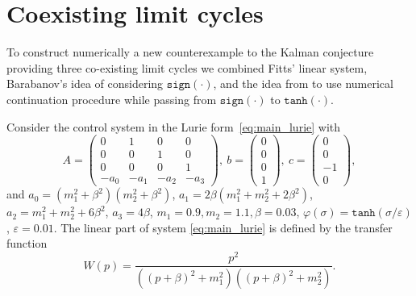 \documentclass{ifacconf}
\theoremstyle{plain}
\begin{document}
\section{Coexisting limit cycles}

To construct numerically a new counterexample to the Kalman conjecture
providing three co-existing limit cycles
we combined Fitts' linear system,
Barabanov's idea of considering $\texttt{sign}(\cdot)$,
and the idea from \citep{LeonovK-2011-DAN} to use numerical continuation procedure
while passing from $\texttt{sign}(\cdot)$ to $\texttt{tanh}(\cdot)$.

Consider the control system in the Lurie form~\eqref{eq:main_lurie}
with
\begin{equation}\label{eq:main:matricies}
  A\!=\!\left(
  \begin{array}{cccc}
    0 & 1 & 0 & 0 \\
    0 & 0 & 1 & 0 \\
    0 & 0 & 0 & 1  \\
    -a_0 & -a_1 & -a_2 & -a_3
  \end{array}
  \right)\!\!, \
  b = \left(
    \begin{array}{c}
    0 \\ 0 \\ 0 \\ 1
    \end{array}
  \right)\!\!, \
  c = \left(
    \begin{array}{c}
    0 \\ 0 \\ -1 \\ 0
    \end{array}
  \right)\!\!,
\end{equation}
and $a_0 = (m_1^2+\beta^2)(m_2^2+\beta^2)$,
$a_1 = 2 \beta (m_1^2 + m_2^2 + 2 \beta^2)$,
$a_2 = m_1^2 + m_2^2 + 6 \beta^2$, $a_3 = 4 \beta$, $m_1 = 0.9, m_2 = 1.1,
\beta = 0.03$, $\varphi(\sigma) = \texttt{tanh}(\sigma / \varepsilon)$,
$\varepsilon = 0.01$.
The linear part of system \eqref{eq:main_lurie} is defined by the transfer function
\begin{equation}\label{eq:trFuncFitts}
  W(p) = \frac{p^2}{\left((p+\beta)^2 + m_1^2\right)\left((p+\beta)^2 + m_2^2\right)}.
\end{equation}
\end{document}
